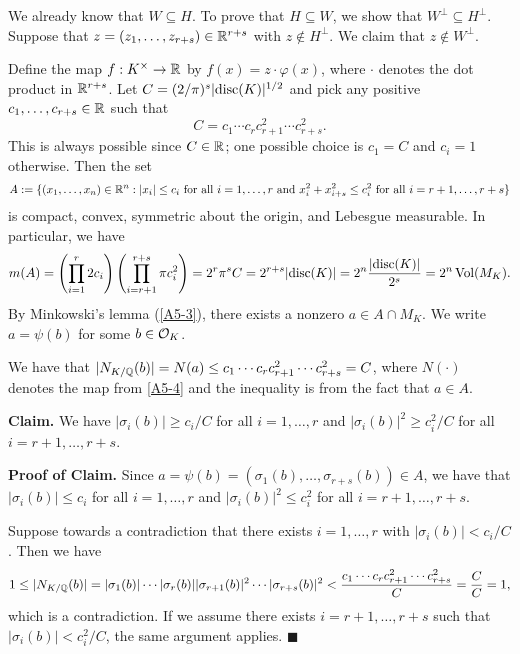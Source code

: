 \begin{pf}
    We already know that $W \subseteq H$. To prove that $H \subseteq W$, we show that 
    $W^\perp \subseteq H^\perp$. Suppose that $z = (z_1, \dots, z_{r+s}) \in \mathbb{R}^{r+s}$ 
    with $z \notin H^\perp$. We claim that $z \notin W^\perp$. 

    Define the map $f : K^\times \to \mathbb{R}$ by $f(x) = z \cdot \varphi(x)$, where $\cdot$ 
    denotes the dot product in $\mathbb{R}^{r+s}$. Let $C = (2/\pi)^s \lvert\operatorname{disc}(K)\rvert^{1/2}$ 
    and pick any positive $c_1, \dots, c_{r+s} \in \mathbb{R}$ such that 
    \[ C = c_1 \cdots c_r c_{r+1}^2 \cdots c_{r+s}^2. \] 
    This is always possible since $C \in \mathbb{R}$; one possible choice is $c_1 = C$ and 
    $c_i = 1$ otherwise. 
    Then the set 
    \[ A := \{(x_1, \dots, x_n) \in \mathbb{R}^n : |x_i| \leq c_i \text{ for all $i = 1, \dots, r$ 
    and $x_i^2 + x_{i+s}^2 \leq c_i^2$ for all $i = r+1, \dots, r+s$}\} \] 
    is compact, convex, symmetric about the origin, and Lebesgue measurable. In particular, 
    we have
    \[ m(A) = \left( \prod_{i=1}^r 2c_i \right) \left( \prod_{i=r+1}^{r+s} \pi c_i^2 \right) 
    = 2^r \pi^s C = 2^{r+s} \lvert\operatorname{disc}(K)\rvert = 2^n \frac{\lvert\operatorname{disc}(K)\rvert}{2^s} 
    = 2^n \operatorname{Vol}(M_K). \] 
    By Minkowski's lemma (\ref{A5-3}), there exists a nonzero $a \in A \cap M_K$. We write 
    $a = \psi(b)$ for some $b \in {\cal O}_K$. 

    We have that $|N_{K/\mathbb{Q}}(b)| = N(a) \leq c_1 \cdots c_r c_{r+1}^2 
    \cdots c_{r+s}^2 = C$, where $N(\cdot)$ denotes the map from \ref{A5-4} and 
    the inequality is from the fact that $a \in A$.

    {\bf Claim.} We have $|\sigma_i(b)| \geq c_i/C$ for all $i = 1, \dots, r$
    and $|\sigma_i(b)|^2 \geq c_i^2/C$ for all $i = r+1, \dots, r+s$.

    {\bf Proof of Claim.} Since $a = \psi(b) = (\sigma_1(b), \dots, \sigma_{r+s}(b)) \in A$, 
    we have that $|\sigma_i(b)| \leq c_i$ for all $i = 1, \dots, r$ and 
    $|\sigma_i(b)|^2 \leq c_i^2$ for all $i = r+1, \dots, r+s$. 

    Suppose towards a contradiction that there exists $i = 1, \dots, r$ with 
    $|\sigma_i(b)| < c_i/C$. Then we have 
    \[ 1 \leq |N_{K/\mathbb{Q}}(b)| = |\sigma_1(b)| \cdots |\sigma_r(b)| |\sigma_{r+1}(b)|^2 
    \cdots |\sigma_{r+s}(b)|^2 < \frac{c_1 \cdots c_r c_{r+1}^2 \cdots c_{r+s}^2}{C} 
    = \frac{C}{C} = 1, \] 
    which is a contradiction. If we assume there exists $i = r+1, \dots, r+s$ 
    such that $|\sigma_i(b)| < c_i^2/C$, the same argument applies. \hfill $\blacksquare$ 


\end{pf}
